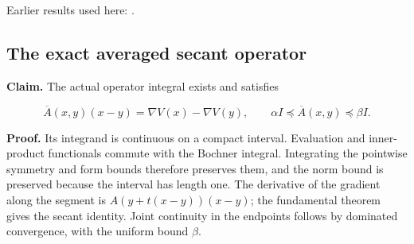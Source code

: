 \documentclass[11pt,a4paper]{report}
\begin{document}
Earlier results used here: \cite[Section~3.2.3]{LangevinLean2026ULASC}.
\subsection{\texorpdfstring{The exact averaged secant operator}{The exact averaged secant operator}}
\label{report-step-WassersteinMixing-Curvature-lean-3}


\textbf{Claim.} The actual operator integral exists and satisfies

\[\overline A(x,y)(x-y)=\nabla V(x)-\nabla V(y),\qquad \alpha I\preceq\overline A(x,y)\preceq\beta I.\]

\textbf{Proof.} Its integrand is continuous on a compact interval. Evaluation and inner-product functionals commute with the Bochner integral. Integrating the pointwise symmetry and form bounds therefore preserves them, and the norm bound is preserved because the interval has length one. The derivative of the gradient along the segment is \(A(y+t(x-y))(x-y)\); the fundamental theorem gives the secant identity. Joint continuity in the endpoints follows by dominated convergence, with the uniform bound \(\beta\).
\end{document}
